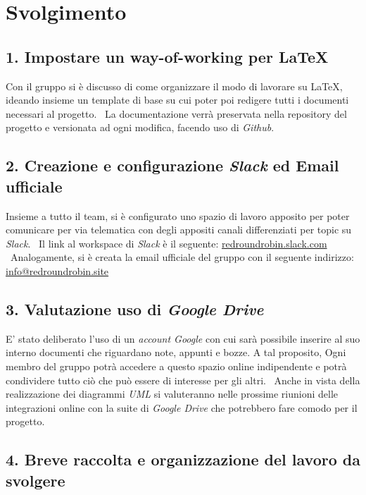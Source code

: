 \newpage
\section*{Svolgimento}

\subsection*{1. Impostare un way-of-working per \LaTeX{} }

Con il gruppo si è discusso di come organizzare il modo di lavorare su \LaTeX{}, ideando insieme un template di base su cui poter poi redigere tutti i documenti necessari al progetto. \
La documentazione verrà preservata nella repository del progetto e versionata ad ogni modifica, facendo uso di \textit{Github}.

\subsection*{2. Creazione e configurazione \textit{Slack} ed Email ufficiale}

Insieme a tutto il team, si è configurato uno spazio di lavoro apposito per poter comunicare per via telematica con degli appositi canali differenziati per topic su \textit{Slack}. \
Il link al workspace di \textit{Slack} è il seguente: \href{http://redroundrobin.slack.com}{redroundrobin.slack.com} \
Analogamente, si è creata la email ufficiale del gruppo con il seguente indirizzo:
\href{mailto:info@redroundrobin.site}{info@redroundrobin.site}


\subsection*{3. Valutazione uso di \textit{Google Drive}}

E' stato deliberato l'uso di un \textit{account Google} con cui sarà possibile inserire al suo interno documenti che riguardano note, appunti e bozze. A tal proposito, Ogni membro del gruppo potrà accedere a questo spazio online indipendente e potrà condividere tutto ciò che può essere di interesse per gli altri. \
Anche in vista della realizzazione dei diagrammi \textit{UML} si valuteranno nelle prossime riunioni delle integrazioni online con la suite di \textit{Google Drive} che potrebbero fare comodo per il progetto.


\subsection*{4. Breve raccolta e organizzazione del lavoro da svolgere}

